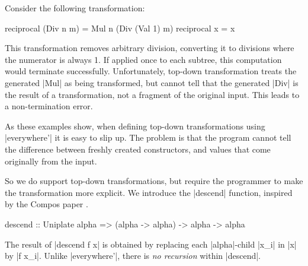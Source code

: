 \begin{example}
Consider the following transformation:

\begin{code}
reciprocal (Div n m)  = Mul n (Div (Val 1) m)
reciprocal x          = x
\end{code}

This transformation removes arbitrary division, converting it to divisions where the numerator is always 1. If applied once to each subtree, this computation would terminate successfully. Unfortunately, top-down transformation treats the generated |Mul| as  being transformed, but cannot tell that the generated |Div| is the result of a transformation, not a fragment of the original input. This leads to a non-termination error.
\end{example}

As these examples show, when defining top-down transformations using |everywhere'| it is easy to slip up. The problem is that the program cannot tell the difference between freshly created constructors, and values that come originally from the input.

So we do support top-down transformations, but require the programmer to make the transformation more explicit. We introduce the |descend| function, inspired by the Compos paper \cite{bringert:compos}.

\begin{code}
descend :: Uniplate alpha => (alpha -> alpha) -> alpha -> alpha
\end{code}

The result of |descend f x| is obtained by replacing each |alpha|-child |x_i| in |x| by |f x_i|. Unlike |everywhere'|, there is \textit{no recursion} within |descend|.

\begin{comment}
\begin{code}
data Expr = Var String | Let String Expr Expr | Add Expr Expr
\end{code}
\end{comment}

